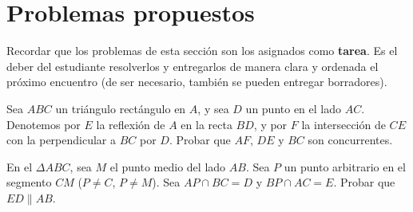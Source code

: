 \section{Problemas propuestos}

Recordar que los problemas de esta sección son los asignados como \textbf{tarea}.
Es el deber del estudiante resolverlos y entregarlos de manera clara y ordenada el próximo encuentro
(de ser necesario, también se pueden entregar borradores).

\begin{section-problem}
    Sea $ABC$ un triángulo rectángulo en $A$, y sea $D$ un punto en el lado $AC$.
    Denotemos por $E$ la reflexión de $A$ en la recta $BD$, y por $F$ la intersección de $CE$ con la perpendicular a $BC$ por $D$.
    Probar que $AF$, $DE$ y $BC$ son concurrentes.
\end{section-problem}

\begin{section-problem}
    En el $\Delta ABC$, sea $M$ el punto medio del lado $AB$.
    Sea $P$ un punto arbitrario en el segmento $CM$ ($P \neq C$, $P \neq M$).
    Sea $AP \cap BC = D$ y $BP \cap AC = E$.
    Probar que $ED \parallel AB$.
\end{section-problem}
